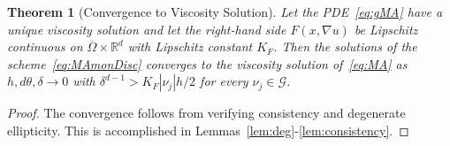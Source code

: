\documentclass{amsart}
\newtheorem{theorem}{Theorem}
\theoremstyle{lemma}
\theoremstyle{remark}
\begin{document}
\begin{theorem}[Convergence to Viscosity Solution]\label{thm:conv}
Let the PDE~\eqref{eq:gMA} have a unique viscosity solution and let the right-hand side $F(x,\nabla u)$ be Lipschitz continuous on $\overline{\Omega}\times{\mathbb{R}}^d$ with Lipschitz constant $K_F$.
Then the solutions of the scheme~\eqref{eq:MAmonDisc} converges to the viscosity solution of~\eqref{eq:MA} as $h,d\theta,\delta\to0$ with $\delta^{d-1}>K_F{\left\vert{\nu_j}\right\vert}h/2$ for every $\nu_j\in{\mathcal{G}}$.
\end{theorem}
\begin{proof}
The convergence follows from verifying consistency and degenerate ellipticity.   This is accomplished in Lemmas~\ref{lem:deg}-\ref{lem:consistency}.
\end{proof}
\end{document}
